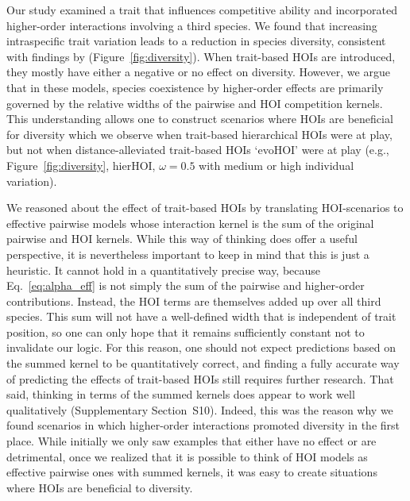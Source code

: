\documentclass[11pt]{article}
\newcommand{\SI}{Supplementary}
\begin{document}
Our study examined a trait that influences competitive ability and incorporated higher-order interactions involving a third species. We found that increasing intraspecific trait variation leads to a reduction in species diversity, consistent with findings by \cite{barabas_effect_2016} (Figure~\ref{fig:diversity}). When trait-based HOIs are introduced, they mostly have either a negative or no effect on diversity. However, we argue that in these models, species coexistence by higher-order effects are primarily governed by the relative widths of the pairwise and HOI competition kernels. This understanding allows one to construct scenarios where HOIs are beneficial for diversity which we observe when trait-based hierarchical HOIs were at play, but not when distance-alleviated trait-based HOIs `evoHOI' were at play (e.g., Figure~\ref{fig:diversity}, hierHOI, $\omega = 0.5$ with medium or high individual variation).

We reasoned about the effect of trait-based HOIs by translating HOI-scenarios to effective pairwise models whose interaction kernel is the sum of the original pairwise and HOI kernels. While this way of thinking does offer a useful perspective, it is nevertheless important to keep in mind that this is just a heuristic. It cannot hold in a quantitatively precise way, because Eq.~\ref{eq:alpha_eff} is not simply the sum of the pairwise and higher-order contributions. Instead, the HOI terms are themselves added up over all third species. This sum will not have a well-defined width that is independent of trait position, so one can only hope that it remains sufficiently constant not to invalidate our logic. For this reason, one should not expect predictions based on the summed kernel to be quantitatively correct, and finding a fully accurate way of predicting the effects of trait-based HOIs still requires further research. That said, thinking in terms of the summed kernels does appear to work well qualitatively (\SI{} Section~S10). Indeed, this was the reason why we found scenarios in which higher-order interactions promoted diversity in the first place. While initially we only saw examples that either have no effect or are detrimental, once we realized that it is possible to think of HOI models as effective pairwise ones with summed kernels, it was easy to create situations where HOIs are beneficial to diversity.
\end{document}
